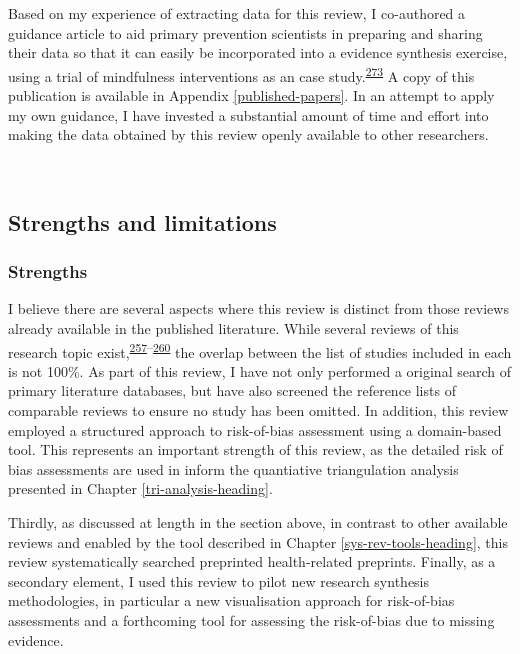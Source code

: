\documentclass[a4paper, twoside]{templates/ociamthesis}
\begin{document}
Based on my experience of extracting data for this review, I co-authored a guidance article to aid primary prevention scientists in preparing and sharing their data so that it can easily be incorporated into a evidence synthesis exercise, using a trial of mindfulness interventions as an case study.\textsuperscript{\protect\hyperlink{ref-hennessy2021}{273}} A copy of this publication is available in Appendix \ref{published-papers}. In an attempt to apply my own guidance, I have invested a substantial amount of time and effort into making the data obtained by this review openly available to other researchers.

~

\hypertarget{strengths-and-limitations}{%
\subsection{Strengths and limitations}\label{strengths-and-limitations}}

\hypertarget{strengths}{%
\subsubsection{Strengths}\label{strengths}}

I believe there are several aspects where this review is distinct from those reviews already available in the published literature. While several reviews of this research topic exist,\textsuperscript{\protect\hyperlink{ref-chu2018}{257}--\protect\hyperlink{ref-poly2020}{260}} the overlap between the list of studies included in each is not 100\%. As part of this review, I have not only performed a original search of primary literature databases, but have also screened the reference lists of comparable reviews to ensure no study has been omitted. In addition, this review employed a structured approach to risk-of-bias assessment using a domain-based tool. This represents an important strength of this review, as the detailed risk of bias assessments are used in inform the quantiative triangulation analysis presented in Chapter \ref{tri-analysis-heading}.

Thirdly, as discussed at length in the section above, in contrast to other available reviews and enabled by the tool described in Chapter \ref{sys-rev-tools-heading}, this review systematically searched preprinted health-related preprints. Finally, as a secondary element, I used this review to pilot new research synthesis methodologies, in particular a new visualisation approach for risk-of-bias assessments and a forthcoming tool for assessing the risk-of-bias due to missing evidence.
\end{document}

